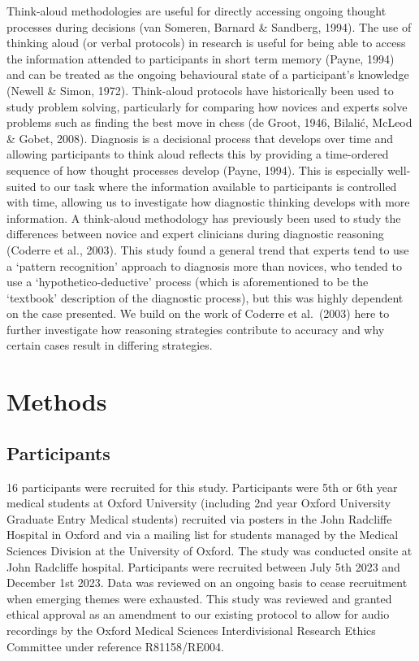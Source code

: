 \documentclass[a4paper, nobind]{templates/ociamthesis}
\begin{document}
Think-aloud methodologies are useful for directly accessing ongoing thought processes during decisions (van Someren, Barnard \& Sandberg, 1994). The use of thinking aloud (or verbal protocols) in research is useful for being able to access the information attended to participants in short term memory (Payne, 1994) and can be treated as the ongoing behavioural state of a participant's knowledge (Newell \& Simon, 1972). Think-aloud protocols have historically been used to study problem solving, particularly for comparing how novices and experts solve problems such as finding the best move in chess (de Groot, 1946, Bilalić, McLeod \& Gobet, 2008). Diagnosis is a decisional process that develops over time and allowing participants to think aloud reflects this by providing a time-ordered sequence of how thought processes develop (Payne, 1994). This is especially well-suited to our task where the information available to participants is controlled with time, allowing us to investigate how diagnostic thinking develops with more information. A think-aloud methodology has previously been used to study the differences between novice and expert clinicians during diagnostic reasoning (Coderre et al., 2003). This study found a general trend that experts tend to use a `pattern recognition' approach to diagnosis more than novices, who tended to use a `hypothetico-deductive' process (which is aforementioned to be the `textbook' description of the diagnostic process), but this was highly dependent on the case presented. We build on the work of Coderre et al.~(2003) here to further investigate how reasoning strategies contribute to accuracy and why certain cases result in differing strategies.

\section*{Methods}\label{methods-1}

\subsection*{Participants}\label{participants-1}

16 participants were recruited for this study. Participants were 5th or 6th year medical students at Oxford University (including 2nd year Oxford University Graduate Entry Medical students) recruited via posters in the John Radcliffe Hospital in Oxford and via a mailing list for students managed by the Medical Sciences Division at the University of Oxford. The study was conducted onsite at John Radcliffe hospital. Participants were recruited between July 5th 2023 and December 1st 2023. Data was reviewed on an ongoing basis to cease recruitment when emerging themes were exhausted. This study was reviewed and granted ethical approval as an amendment to our existing protocol to allow for audio recordings by the Oxford Medical Sciences Interdivisional Research Ethics Committee under reference R81158/RE004.
\end{document}
